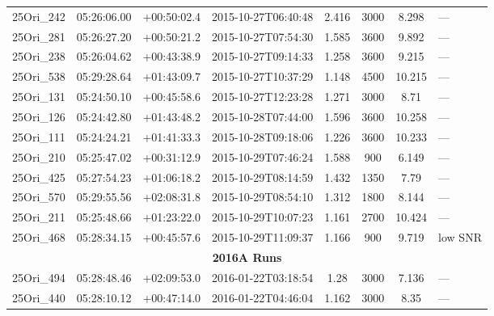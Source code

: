 \documentclass[12pt]{article}
\begin{document}
\begin{table}[ht!]
\begin{center}
\begin{threeparttable}
\begin{tabular}{lccccccl}
	25Ori\_242    & 05:26:06.00 & +00:50:02.4 & 2015-10-27T06:40:48  & 2.416         & 3000             & 8.298  & ---                      \\
	25Ori\_281    & 05:26:27.20 & +00:50:21.2 & 2015-10-27T07:54:30  & 1.585         & 3600             & 9.892  & ---                      \\
	25Ori\_238    & 05:26:04.62 & +00:43:38.9 & 2015-10-27T09:14:33  & 1.258         & 3600             & 9.215  & ---                      \\
	25Ori\_538    & 05:29:28.64 & +01:43:09.7 & 2015-10-27T10:37:29  & 1.148         & 4500             & 10.215 & ---                      \\
	25Ori\_131    & 05:24:50.10 & +00:45:58.6 & 2015-10-27T12:23:28  & 1.271         & 3000             & 8.71   & ---                      \\
	25Ori\_126    & 05:24:42.80 & +01:43:48.2 & 2015-10-28T07:44:00  & 1.596         & 3600             & 10.258 & ---                      \\
	25Ori\_111    & 05:24:24.21 & +01:41:33.3 & 2015-10-28T09:18:06  & 1.226         & 3600             & 10.233 & ---                      \\
	25Ori\_210    & 05:25:47.02 & +00:31:12.9 & 2015-10-29T07:46:24  & 1.588         & 900              & 6.149  & ---                      \\
	25Ori\_425    & 05:27:54.23 & +01:06:18.2 & 2015-10-29T08:14:59  & 1.432         & 1350             & 7.79   & ---                      \\
	25Ori\_570    & 05:29:55.56 & +02:08:31.8 & 2015-10-29T08:54:10  & 1.312         & 1800             & 8.144  & ---                      \\
	25Ori\_211    & 05:25:48.66 & +01:23:22.0 & 2015-10-29T10:07:23  & 1.161         & 2700             & 10.424 & ---                      \\
	25Ori\_468    & 05:28:34.15 & +00:45:57.6 & 2015-10-29T11:09:37  & 1.166         & 900              & 9.719  & low SNR                  \\
	\multicolumn{8}{c}{{\bf 2016A Runs}} \\
	25Ori\_494    & 05:28:48.46 & +02:09:53.0 & 2016-01-22T03:18:54  & 1.28          & 3000             & 7.136  & ---                      \\
	25Ori\_440    & 05:28:10.12 & +00:47:14.0 & 2016-01-22T04:46:04  & 1.162         & 3000             & 8.35   & ---                      \\

\end{tabular}
\end{threeparttable}
\end{center}
\end{table}
\end{document}
